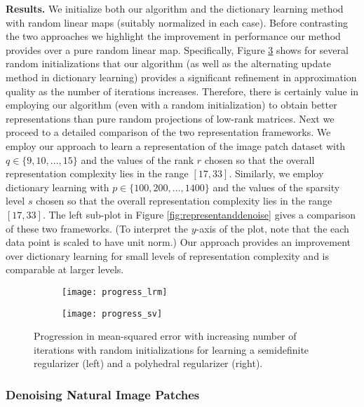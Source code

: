 \documentclass[11pt,letterpaper]{article}
\begin{document}
\textbf{Results.} We initialize both our algorithm and the dictionary learning method with random linear maps (suitably normalized in each case).  Before contrasting the two approaches we highlight the improvement in performance our method provides over a pure random linear map.  Specifically, Figure \ref{fig:progress} shows for several random initializations that our algorithm (as well as the alternating update method in dictionary learning) provides a significant refinement in approximation quality as the number of iterations increases.  Therefore, there is certainly value in employing our algorithm (even with a random initialization) to obtain better representations than pure random projections of low-rank matrices.  Next we proceed to a detailed comparison of the two representation frameworks.  We employ our approach to learn a representation of the image patch dataset with $q \in \{9, 10,\dots, 15 \}$ and the values of the rank $r$ chosen so that the overall representation complexity lies in the range $[17,33]$.  Similarly, we employ dictionary learning with $p \in \{100, 200, \dots, 1400\}$ and the values of the sparsity level $s$ chosen so that the overall representation complexity lies in the range $[17,33]$.  The left sub-plot in Figure \ref{fig:representanddenoise} gives a comparison of these two frameworks.  (To interpret the $y$-axis of the plot, note that the each data point is scaled to have unit norm.) Our approach provides an improvement over dictionary learning for small levels of representation complexity and is comparable at larger levels.

\begin{figure}
	\centering
	\begin{subfigure}{.5\textwidth}
		\centering
		\texttt{[image: progress\_lrm]}
		\label{fig:progress_lrm}
	\end{subfigure}%
	\begin{subfigure}{.5\textwidth}
		\centering
		\texttt{[image: progress\_sv]}
		\label{fig:progress_sv}
	\end{subfigure}
	\caption{Progression in mean-squared error with increasing number of iterations with random initializations for learning a semidefinite regularizer (left) and a polyhedral regularizer (right).}
	\label{fig:progress}
\end{figure}

\subsubsection{Denoising Natural Image Patches} \label{sec:numexp_raw_den}
\end{document}

